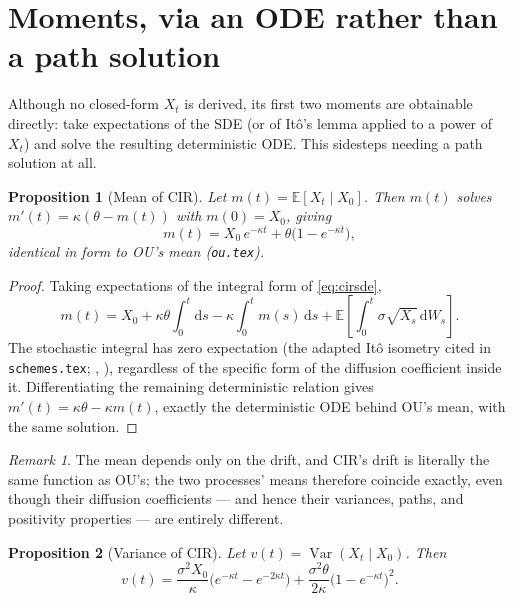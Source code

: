 \documentclass[11pt]{article}
\newcommand{\E}{\mathbb{E}}
\newcommand{\Var}{\operatorname{Var}}
\newcommand{\dd}{\mathrm{d}}
\theoremstyle{plain}
\newtheorem{proposition}{Proposition}
\theoremstyle{definition}
\theoremstyle{remark}
\newtheorem{remark}{Remark}
\begin{document}
\section{Moments, via an ODE rather than a path solution}

Although no closed-form $X_t$ is derived, its first two moments are
obtainable directly: take expectations of the SDE (or of It\^o's
lemma applied to a power of $X_t$) and solve the resulting
deterministic ODE. This sidesteps needing a path solution at
all.

\begin{proposition}[Mean of CIR]\label{prop:cir-mean}
Let $m(t)=\E[X_t\mid X_0]$. Then $m(t)$ solves
$m'(t)=\kappa(\theta-m(t))$ with $m(0)=X_0$, giving
\[
   m(t) = X_0\,e^{-\kappa t} + \theta\big(1-e^{-\kappa t}\big),
\]
identical in form to OU's mean (\texttt{ou.tex}).
\end{proposition}

\begin{proof}
Taking expectations of the integral form of \eqref{eq:cirsde},
\[
   m(t) = X_0 + \kappa\theta\int_0^t \dd s - \kappa\int_0^t m(s)\,\dd s
        + \E\left[\int_0^t \sigma\sqrt{X_s}\,\dd W_s\right].
\]
The stochastic integral has zero expectation (the adapted It\^o
isometry cited in \texttt{schemes.tex}; ,
), regardless of the specific form of the
diffusion coefficient inside it. Differentiating the remaining
deterministic relation gives $m'(t)=\kappa\theta-\kappa m(t)$, exactly
the deterministic ODE behind OU's mean, with the same solution.
\end{proof}

\begin{remark}
The mean depends only on the drift, and CIR's drift is literally the
same function as OU's; the two processes' means therefore coincide
exactly, even though their diffusion coefficients --- and hence their
variances, paths, and positivity properties --- are entirely
different.
\end{remark}

\begin{proposition}[Variance of CIR]\label{prop:cir-var}
Let $v(t)=\Var(X_t\mid X_0)$. Then
\[
   v(t) = \frac{\sigma^2 X_0}{\kappa}\Big(e^{-\kappa t}-e^{-2\kappa t}\Big)
        + \frac{\sigma^2\theta}{2\kappa}\Big(1-e^{-\kappa t}\Big)^2 .
\]
\end{proposition}
\end{document}
